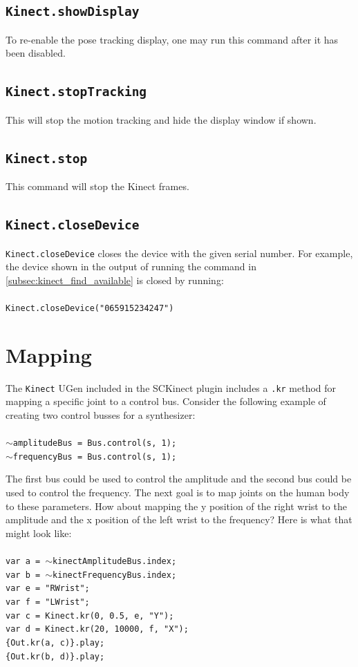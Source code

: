 \documentclass{article}
\begin{document}
\subsection{\texttt{Kinect.showDisplay}}\label{subsec:kinect_show_display}
To re-enable the pose tracking display, one may run this command after it has been disabled.
\subsection{\texttt{Kinect.stopTracking}}\label{subsec:kinect_stop_tracking}
This will stop the motion tracking and hide the display window if shown.
\subsection{\texttt{Kinect.stop}}\label{subsec:kinect_stop}
This command will stop the Kinect frames.
\subsection{\texttt{Kinect.closeDevice}}\label{subsec:kinect_close_device}
\texttt{Kinect.closeDevice} closes the device with the given serial number. For example, the device shown in the output of running the command in \ref{subsec:kinect_find_available} is closed by running:\\
\\
\texttt{Kinect.closeDevice("065915234247")}
\section{Mapping}
The \texttt{Kinect} UGen included in the SCKinect plugin includes a \texttt{.kr} method for mapping a specific joint to a control bus. Consider the following example of creating two control busses for a synthesizer:\\
\texttt{\\
    $\sim$amplitudeBus = Bus.control(s, 1);\\
	$\sim$frequencyBus = Bus.control(s, 1);\\
}

The first bus could be used to control the amplitude and the second bus could be used to control the frequency. The next goal is to map joints on the human body to these parameters. How about mapping the y position of the right wrist to the amplitude and the x position of the left wrist to the frequency? Here is what that might look like:\\
\texttt{\\
    var a = $\sim$kinectAmplitudeBus.index;\\
    var b = $\sim$kinectFrequencyBus.index;\\
    var e = "RWrist";\\
    var f = "LWrist";\\
    var c = Kinect.kr(0, 0.5, e, "Y");\\
    var d = Kinect.kr(20, 10000, f, "X");\\
    \{Out.kr(a, c)\}.play;\\
	\{Out.kr(b, d)\}.play;\\
}
\end{document}
